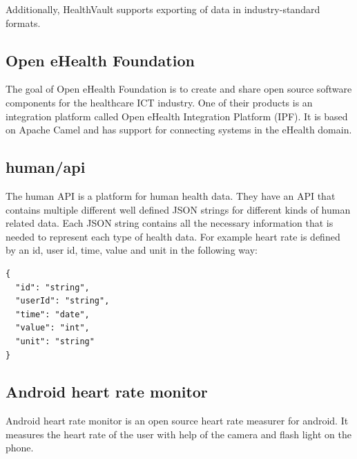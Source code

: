 Additionally, HealthVault supports exporting of data in industry-standard formats.



\subsection{Open eHealth Foundation} \nocite{OpenEHealthFoundation}

The goal of Open eHealth Foundation is to create and share open source software components for the healthcare ICT industry.
One of their products is an integration platform called Open eHealth Integration Platform (IPF).
It is based on Apache Camel and has support for connecting systems in the eHealth domain.

\subsection{human/api} \nocite{HumanAPI}

The human API is a platform for human health data. 
They have an API that contains multiple different well defined JSON strings for different kinds of human related data.
Each JSON string contains all the necessary information that is needed to represent each type of health data.
For example heart rate is defined by an id, user id, time, value and unit in the following way:

\begin{verbatim}
{
  "id": "string",
  "userId": "string",
  "time": "date",
  "value": "int",
  "unit": "string"
}
\end{verbatim}

\subsection{Android heart rate monitor} \nocite{AndroidHeartRateMonitor}
\label{subsec: AndroidHeartRateMonitor}

Android heart rate monitor is an open source heart rate measurer for android.
It measures the heart rate of the user with help of the camera and flash light on the phone.

